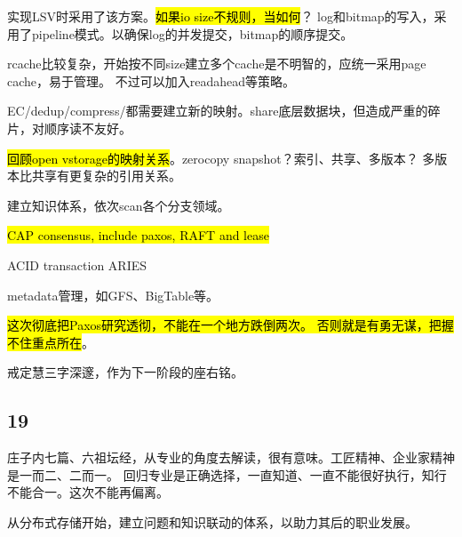 实现LSV时采用了该方案。\hl{如果io size不规则，当如何}？
log和bitmap的写入，采用了pipeline模式。以确保log的并发提交，bitmap的顺序提交。

rcache比较复杂，开始按不同size建立多个cache是不明智的，应统一采用page cache，易于管理。
不过可以加入readahead等策略。

EC/dedup/compress/都需要建立新的映射。share底层数据块，但造成严重的碎片，对顺序读不友好。

\hl{回顾open vstorage的映射关系}。zerocopy snapshot？索引、共享、多版本？
多版本比共享有更复杂的引用关系。

\hrulefill

建立知识体系，依次scan各个分支领域。
\begin{enumbox}
\item \hl{CAP consensus, include paxos, RAFT and lease}
\item ACID transaction ARIES
\item metadata管理，如GFS、BigTable等。
\end{enumbox}

\hl{这次彻底把Paxos研究透彻，不能在一个地方跌倒两次。
否则就是有勇无谋，把握不住重点所在}。

戒定慧三字深邃，作为下一阶段的座右铭。

\subsection{19}

庄子内七篇、六祖坛经，从专业的角度去解读，很有意味。工匠精神、企业家精神是一而二、二而一。
回归专业是正确选择，一直知道、一直不能很好执行，知行不能合一。这次不能再偏离。

从分布式存储开始，建立问题和知识联动的体系，以助力其后的职业发展。
